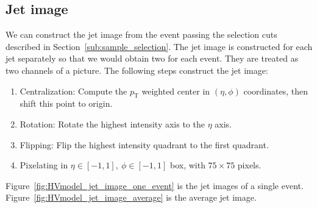 \documentclass[12pt]{article}
\begin{document}
	\subsection{Jet image}%
	\label{sub:jet_image}
		We can construct the jet image from the event passing the selection cuts described in Section~\ref{sub:sample_selection}. The jet image is constructed for each jet separately so that we would obtain two for each event. They are treated as two channels of a picture. The following steps construct the jet image:
		\begin{enumerate}
			\item Centralization: Compute the $p_{\text{T}}$ weighted center in $\left( \eta,\phi \right) $ coordinates, then shift this point to origin.
			\item Rotation: Rotate the highest intensity axis to the $\eta$ axis.
			\item Flipping:	Flip the highest intensity quadrant to the first quadrant.
			\item Pixelating in $\eta \in [-1,1],\ \phi \in [-1,1]$ box, with $75\times 75$ pixels.
		\end{enumerate}

		Figure~\ref{fig:HVmodel_jet_image_one_event} is the jet images of a single event. Figure~\ref{fig:HVmodel_jet_image_average} is the average jet image. 
\end{document}
